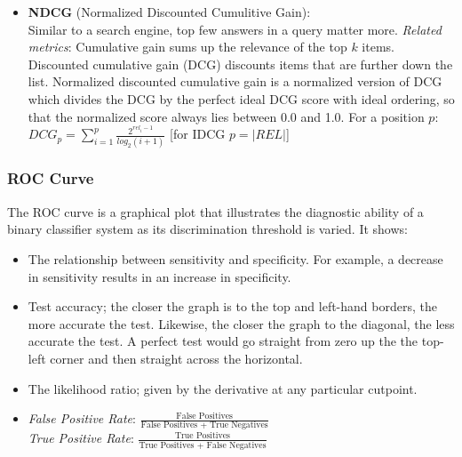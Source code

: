 \documentclass[english]{latex4ei/latex4ei_sheet}
\begin{document}
\begin{sectionbox}
\begin{itemize}
    \item \textbf{NDCG} (Normalized Discounted Cumulitive Gain):\\
    Similar to a search engine, top few answers in a query matter more.
    \emph{Related metrics}: Cumulative gain sums up the relevance of the top $k$ items. Discounted cumulative gain (DCG) discounts items that are further down the list. Normalized discounted cumulative gain is a normalized version of DCG which divides the DCG by the perfect ideal  DCG score with ideal ordering, so that the normalized score always lies between 0.0 and 1.0. For a position $p$:
    $DCG_p=\sum_{i=1}^p\frac{2^{rel_i-1}}{log_2(i+1)}$ \hspace{5}[for IDCG $p=|REL|$]
\end{itemize}
\subsubsection{ROC Curve}
The ROC curve is a graphical plot that illustrates the diagnostic ability of a binary classifier system as its discrimination threshold is varied. It shows:
\begin{itemize}
    \item The relationship between sensitivity and specificity. For example, a decrease in sensitivity results in an increase in specificity.
    \item Test accuracy; the closer the graph is to the top and left-hand borders, the more accurate the test. Likewise, the closer the graph to the diagonal, the less accurate the test. A perfect test would go straight from zero up the the top-left corner and then straight across the horizontal.
    \item The likelihood ratio; given by the derivative at any particular cutpoint.
    \item \emph{False Positive Rate}: $\frac{\text{False Positives}}{\text{False Positives + True Negatives}}$\\
    \emph{True Positive Rate}: $\frac{\text{True Positives}}{\text{True Positives + False Negatives}}$
\end{itemize}
\end{sectionbox}
\end{document}
